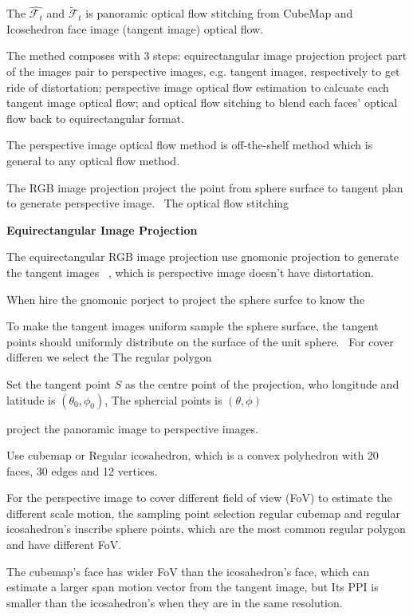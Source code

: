 The $\hat{\mathcal{F}_t}$ and $\tilde{\mathcal{F}}_t$ is panoramic optical flow stitching from CubeMap and Icosehedron face image (tangent image) optical flow.

The methed composes with 3 steps:
 equirectangular image projection project part of the images pair to perspective images, e.g. tangent images, respectively to get ride of distortation;
 perspective image optical flow estimation to calcuate each tangent image optical flow;
 and optical flow sitching to blend each faces' optical flow back to equirectangular format. 
 
 The perspective image optical flow method is off-the-shelf method which is general to any optical flow method.

The RGB image projection project the point from sphere surface to tangent plan to generate perspective image.~\cite{??}
The optical flow stitching 

\textbf{Equirectangular Image Projection}


The equirectangular RGB image projection use gnomonic projection to generate the tangent images ~\cite{??}, which is perspective image doesn't have distortation.

When hire the gnomonic porject to project the sphere surfce to know the 

To make the tangent images uniform sample the sphere surface, the tangent points should uniformly distribute on the surface of the unit sphere.~\cite{??}
For cover differen we select the 
The regular polygon ~\cite{??} 


Set the tangent point $S$ as the centre point of the projection, who longitude and latitude is $(\theta_0, \phi_0)$,
The sphercial points is $(\theta, \phi)$

project the panoramic image to perspective images.

Use cubemap or Regular icosahedron, which is a convex polyhedron with 20 faces, 30 edges and 12 vertices.

For the perspective image to cover different field of view (FoV)  to estimate the different scale motion, the sampling point selection regular cubemap and regular icosahedron's inscribe sphere points, which are the most common regular polygon and have different FoV. ~\cite{xxx}

The cubemap's face has wider FoV than the icosahedron's face, which can estimate a larger span motion vector from the tangent image, but Its PPI is smaller than the icosahedron's when they are in the same resolution.

